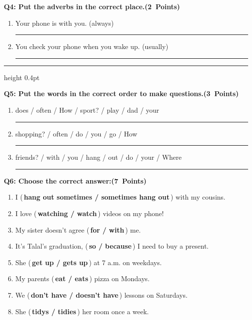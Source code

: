 \documentclass[12pt, a4paper]{article}
\newcommand{\ansline}{\par\vspace{0.45cm}\noindent\rule{\linewidth}{0.4pt}\par}
\newcommand{\question}[2]{\par\vspace{0.3cm}\noindent\textbf{\large #1}\hspace{0.4cm}\hfill\mbox{\textbf{(#2)}}\par\vspace{0.2cm}}
\newcommand{\opt}[1]{(\,\textbf{#1}\,)}
\begin{document}
\question{Q4: Put the adverbs in the correct place.}{2 Points}

\begin{enumerate}[label=\textbf{\arabic*.}, itemsep=0.3cm, leftmargin=*]
\item Your phone is with you. \hfill (always)
\ansline

\item You check your phone when you wake up. \hfill (usually)
\ansline
\end{enumerate}

\vspace{0.2cm}
\hrule height 0.4pt

\question{Q5: Put the words in the correct order to make questions.}{3 Points}

\begin{enumerate}[label=\textbf{\arabic*.}, itemsep=0.3cm, leftmargin=*]
\item does / often / How / sport? / play / dad / your
\ansline

\item shopping? / often / do / you / go / How
\ansline

\item friends? / with / you / hang / out / do / your / Where
\ansline
\end{enumerate}

\newpage
\question{Q6: Choose the correct answer:}{7 Points}

\begin{enumerate}[label=\textbf{\arabic*.}, itemsep=0.45cm, leftmargin=*]
\item I \opt{hang out sometimes / sometimes hang out} with my cousins.
\item I love \opt{watching / watch} videos on my phone!
\item My sister doesn't agree \opt{for / with} me.
\item It's Talal's graduation, \opt{so / because} I need to buy a present.
\item She \opt{get up / gets up} at 7 a.m. on weekdays.
\item My parents \opt{eat / eats} pizza on Mondays.
\item We \opt{don't have / doesn't have} lessons on Saturdays.
\item She \opt{tidys / tidies} her room once a week.
\end{enumerate}
\end{document}
